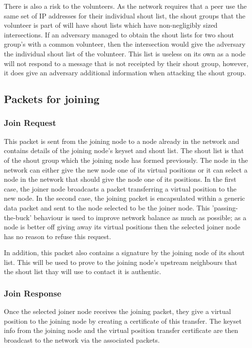 \documentclass[ %
                    author={Luke Murray},
                supervisor={Dr. Simon Hollis},
                     title={Shadow Peer-to-Peer Networks},
                  subtitle={},
                    degree={MEng},
                      year={2013} ]{thesis}
\begin{document}
There is also a risk to the volunteers. As the network requires that a peer use the same set of IP addresses for their individual shout list, the shout groups that the volunteer is part of will have shout lists which have non-negligibly sized intersections. If an adversary managed to obtain the shout lists for two shout group's with a common volunteer, then the intersection would give the adversary the individual shout list of the volunteer. This list is useless on its own as a node will not respond to a message that is not receipted by their shout group, however, it does give an adversary additional information when attacking the shout group.

\subsection{Packets for joining}

\subsubsection{Join Request}

This packet is sent from the joining node to a node already in the network and contains details of the joining node's keyset and shout list. The shout list is that of the shout group which the joining node has formed previously. The node in the network can either give the new node one of its virtual positions or it can select a node in the network that should give the node one of its positions. In the first case, the joiner node broadcasts a packet transferring a virtual position to the new node. In the second case, the joining packet is encapsulated within a generic data packet and sent to the node selected to be the joiner node. This 'passing-the-buck' behaviour is used to improve network balance as much as possible; as a node is better off giving away its virtual positions then the selected joiner node has no reason to refuse this request.

In addition, this packet also contains a signature by the joining node of its shout list. This will be used to prove to the joining node's upstream neighbours that the shout list thay will use to contact it is authentic.

\subsubsection{Join Response}

Once the selected joiner node receives the joining packet, they give a virtual position to the joining node by creating a certificate of this transfer. The keyset info from the joining node and the virtual position transfer certificate are then broadcast to the network via the associated packets.
\end{document}

